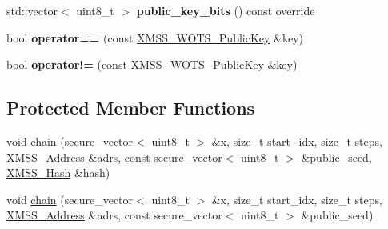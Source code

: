 \begin{DoxyCompactItemize}
\mbox{\label{class_botan_1_1_x_m_s_s___w_o_t_s___public_key_afcfda216c19466d33fbe2b1b0ac34d53}} 
std\+::vector$<$ uint8\+\_\+t $>$ {\bfseries public\+\_\+key\+\_\+bits} () const override
\item 
\mbox{\label{class_botan_1_1_x_m_s_s___w_o_t_s___public_key_a88be27665e699f4c36f426ac68266295}} 
bool {\bfseries operator==} (const \mbox{\hyperlink{class_botan_1_1_x_m_s_s___w_o_t_s___public_key}{X\+M\+S\+S\+\_\+\+W\+O\+T\+S\+\_\+\+Public\+Key}} \&key)
\item 
\mbox{\label{class_botan_1_1_x_m_s_s___w_o_t_s___public_key_aa8894d1173549b226f16d161540ca9dc}} 
bool {\bfseries operator!=} (const \mbox{\hyperlink{class_botan_1_1_x_m_s_s___w_o_t_s___public_key}{X\+M\+S\+S\+\_\+\+W\+O\+T\+S\+\_\+\+Public\+Key}} \&key)
\end{DoxyCompactItemize}
\subsection*{Protected Member Functions}
\begin{DoxyCompactItemize}
\item 
void \mbox{\hyperlink{class_botan_1_1_x_m_s_s___w_o_t_s___public_key_ac94af1061b3136b52bacfc200710b809}{chain}} (secure\+\_\+vector$<$ uint8\+\_\+t $>$ \&x, size\+\_\+t start\+\_\+idx, size\+\_\+t steps, \mbox{\hyperlink{class_botan_1_1_x_m_s_s___address}{X\+M\+S\+S\+\_\+\+Address}} \&adrs, const secure\+\_\+vector$<$ uint8\+\_\+t $>$ \&public\+\_\+seed, \mbox{\hyperlink{class_botan_1_1_x_m_s_s___hash}{X\+M\+S\+S\+\_\+\+Hash}} \&hash)
\item 
void \mbox{\hyperlink{class_botan_1_1_x_m_s_s___w_o_t_s___public_key_a769ef5fc521f106287e49c67797d3fc1}{chain}} (secure\+\_\+vector$<$ uint8\+\_\+t $>$ \&x, size\+\_\+t start\+\_\+idx, size\+\_\+t steps, \mbox{\hyperlink{class_botan_1_1_x_m_s_s___address}{X\+M\+S\+S\+\_\+\+Address}} \&adrs, const secure\+\_\+vector$<$ uint8\+\_\+t $>$ \&public\+\_\+seed)
\end{DoxyCompactItemize}
